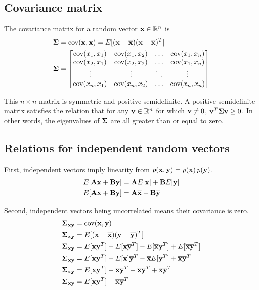\subsection{Covariance matrix}

The covariance matrix for a random vector $\mathbf{x} \in \mathbb{R}^n$ is
\begin{align*}
  \mathbf{\Sigma} &= \operatorname{cov}(\mathbf{x}, \mathbf{x}) = E[(\mathbf{x} - \overline{\mathbf{x}})
    (\mathbf{x} - \overline{\mathbf{x}})^T] \\
  \mathbf{\Sigma} &= \begin{bmatrix}
    \operatorname{cov}(x_1, x_1) & \operatorname{cov}(x_1, x_2) & \ldots & \operatorname{cov}(x_1, x_n) \\
    \operatorname{cov}(x_2, x_1) & \operatorname{cov}(x_2, x_2) & \ldots & \operatorname{cov}(x_1, x_n) \\
    \vdots         & \vdots         & \ddots & \vdots \\
    \operatorname{cov}(x_n, x_1) & \operatorname{cov}(x_n, x_2) & \ldots & \operatorname{cov}(x_n, x_n) \\
  \end{bmatrix}
\end{align*}

This $n \times n$ matrix is symmetric and positive semidefinite. A positive
semidefinite matrix satisfies the relation that for any
$\mathbf{v} \in \mathbb{R}^n$ for which $\mathbf{v} \neq 0$,
$\mathbf{v}^T \mathbf{\Sigma} \mathbf{v} \geq 0$. In other words, the eigenvalues of
$\mathbf{\Sigma}$ are all greater than or equal to zero.

\subsection{Relations for independent random vectors}

First, independent vectors imply linearity from
$p(\mathbf{x}, \mathbf{y}) = p(\mathbf{x}) \,p(\mathbf{y})$.
\begin{align*}
  E[\mathbf{A}\mathbf{x} + \mathbf{B}\mathbf{y}] &= \mathbf{A}E[\mathbf{x}] + \mathbf{B}E[\mathbf{y}] \\
  E[\mathbf{A}\mathbf{x} + \mathbf{B}\mathbf{y}] &= \mathbf{A}\overline{\mathbf{x}} + \mathbf{B}\overline{\mathbf{y}}
\end{align*}

Second, independent vectors being uncorrelated means their covariance is zero.
\begin{align}
  \mathbf{\Sigma}_{\mathbf{x}\mathbf{y}} &= \operatorname{cov}(\mathbf{x}, \mathbf{y}) \nonumber \\
  \mathbf{\Sigma}_{\mathbf{x}\mathbf{y}} &= E[(\mathbf{x} - \overline{\mathbf{x}})
    (\mathbf{y} - \overline{\mathbf{y}})^T] \nonumber \\
  \mathbf{\Sigma}_{\mathbf{x}\mathbf{y}} &= E[\mathbf{x}\mathbf{y}^T] -
    E[\mathbf{x}\overline{\mathbf{y}}^T] - E[\overline{\mathbf{x}}\mathbf{y}^T] +
    E[\overline{\mathbf{x}}\overline{\mathbf{y}}^T] \nonumber \\
  \mathbf{\Sigma}_{\mathbf{x}\mathbf{y}} &= E[\mathbf{x}\mathbf{y}^T] -
    E[\mathbf{x}]\overline{\mathbf{y}}^T - \overline{\mathbf{x}}E[\mathbf{y}^T] +
    \overline{\mathbf{x}}\overline{\mathbf{y}}^T \nonumber \\
  \mathbf{\Sigma}_{\mathbf{x}\mathbf{y}} &= E[\mathbf{x}\mathbf{y}^T] -
    \overline{\mathbf{x}}\overline{\mathbf{y}}^T - \overline{\mathbf{x}}\overline{\mathbf{y}}^T +
    \overline{\mathbf{x}}\overline{\mathbf{y}}^T \nonumber \\
  \mathbf{\Sigma}_{\mathbf{x}\mathbf{y}} &= E[\mathbf{x}\mathbf{y}^T] -
    \overline{\mathbf{x}}\overline{\mathbf{y}}^T \label{eq:prb_sigma}
\end{align}


